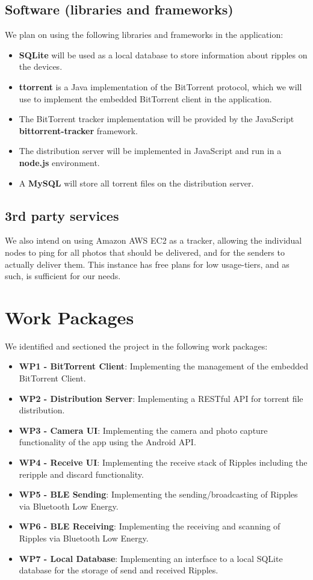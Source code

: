 \documentclass{report}
\begin{document}
\subsection{Software (libraries and frameworks)}
We plan on using the following libraries and frameworks in the application:
\begin{itemize}
  \item \textbf{SQLite} will be used as a local database to store information about ripples on the devices.
  \item \textbf{ttorrent} is a Java implementation of the BitTorrent protocol, which we will use to implement the embedded BitTorrent client in the application.
  \item The BitTorrent tracker implementation will be provided by the JavaScript \textbf{bittorrent-tracker} framework.
  \item The distribution server will be implemented in JavaScript and run in a \textbf{node.js} environment.
  \item A \textbf{MySQL} will store all torrent files on the distribution server.
\end{itemize}

\subsection{3rd party services}
We also intend on using Amazon AWS EC2  as a tracker, allowing the individual nodes to ping for all photos that should be delivered, and for the senders to actually deliver them.
This instance has free plans for low usage-tiers, and as such, is sufficient for our needs.

\section{Work Packages}
We identified and sectioned the project in the following work packages: 

\begin{itemize}
    \item {\bf WP1 - BitTorrent Client}: Implementing the management of the embedded BitTorrent Client.
    \item {\bf WP2 - Distribution Server}: Implementing a RESTful API for torrent file distribution.
    \item {\bf WP3 - Camera UI}: Implementing the camera and photo capture functionality of the app using the Android API.
    \item {\bf WP4 - Receive UI}: Implementing the receive stack of Ripples including the reripple and discard functionality.
    \item {\bf WP5 - BLE Sending}: Implementing the sending/broadcasting of Ripples via Bluetooth Low Energy.
    \item {\bf WP6 - BLE Receiving}: Implementing the receiving and scanning of Ripples via Bluetooth Low Energy.
    \item {\bf WP7 - Local Database}: Implementing an interface to a local SQLite database for the storage of send and received Ripples.
\end{itemize}
\end{document}

